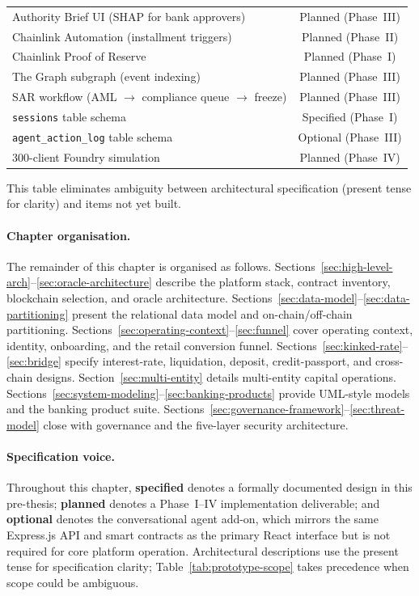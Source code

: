 \documentclass[12pt,a4paper]{report}
\newcommand{\tmarkPartial}{\faHourglassHalf}
\newcommand{\tmarkPlanned}{\textcolor{black!55}{\faCircle}}
\begin{document}
\begin{table}[H]
\begin{tabular}{@{}p{7.5cm}c@{}}
Authority Brief UI (SHAP for bank approvers) & \tmarkPlanned{} Planned (Phase~III) \\
\rowcolor{RowShade}
Chainlink Automation (installment triggers) & \tmarkPlanned{} Planned (Phase~II) \\
Chainlink Proof of Reserve & \tmarkPlanned{} Planned (Phase~I) \\
\rowcolor{RowShade}
The Graph subgraph (event indexing) & \tmarkPlanned{} Planned (Phase~III) \\
SAR workflow (AML $\to$ compliance queue $\to$ freeze) & \tmarkPlanned{} Planned (Phase~III) \\
\rowcolor{RowShade}
\texttt{sessions} table schema & \tmarkPartial{} Specified (Phase~I) \\
\texttt{agent\_action\_log} table schema & \tmarkPlanned{} Optional (Phase~III) \\
\rowcolor{RowShade}
300-client Foundry simulation & \tmarkPlanned{} Planned (Phase~IV) \\
\bottomrule
\end{tabular}
\end{table}

This table eliminates ambiguity between architectural specification (present tense for clarity) and items not yet built.

\paragraph{Chapter organisation.}
The remainder of this chapter is organised as follows. Sections~\ref{sec:high-level-arch}--\ref{sec:oracle-architecture} describe the platform stack, contract inventory, blockchain selection, and oracle architecture. Sections~\ref{sec:data-model}--\ref{sec:data-partitioning} present the relational data model and on-chain/off-chain partitioning. Sections~\ref{sec:operating-context}--\ref{sec:funnel} cover operating context, identity, onboarding, and the retail conversion funnel. Sections~\ref{sec:kinked-rate}--\ref{sec:bridge} specify interest-rate, liquidation, deposit, credit-passport, and cross-chain designs. Section~\ref{sec:multi-entity} details multi-entity capital operations. Sections~\ref{sec:system-modeling}--\ref{sec:banking-products} provide UML-style models and the banking product suite. Sections~\ref{sec:governance-framework}--\ref{sec:threat-model} close with governance and the five-layer security architecture.

\paragraph{Specification voice.}
Throughout this chapter, \textbf{specified} denotes a formally documented design in this pre-thesis; \textbf{planned} denotes a Phase~I--IV implementation deliverable; and \textbf{optional} denotes the conversational agent add-on, which mirrors the same Express.js API and smart contracts as the primary React interface but is not required for core platform operation. Architectural descriptions use the present tense for specification clarity; Table~\ref{tab:prototype-scope} takes precedence when scope could be ambiguous.
\end{document}

